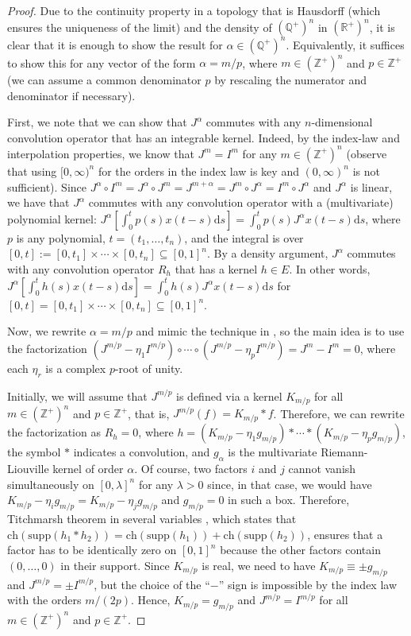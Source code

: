 \documentclass[12pt,reqno]{amsart}
\theoremstyle{plain}
\numberwithin{equation}{section} %
\begin{document}
\begin{proof}
Due to the continuity property in a topology that is Hausdorff (which ensures the uniqueness of the limit) and the density of $(\mathbb{Q}^+)^n$ in $(\mathbb{R}^+)^n$, it is clear that it is enough to show the result for $\alpha \in (\mathbb{Q}^+)^n$. Equivalently, it suffices to show this for any vector of the form $\alpha=m/p$, where $m \in (\mathbb{Z}^+)^n$ and $p \in \mathbb{Z}^+$ (we can assume a common denominator $p$ by rescaling the numerator and denominator if necessary). 

First, we note that we can show that $J^{\alpha}$ commutes with any $n$-dimensional convolution operator that has an integrable kernel. Indeed, by the index-law and interpolation properties, we know that $J^m=I^m$ for any $m \in (\mathbb{Z}^+)^n$ (observe that using $[0,\infty)^n$ for the orders in the index law is key and $(0,\infty)^n$ is not sufficient). Since $J^{\alpha}\circ I^m=J^{\alpha}\circ J^m=J^{m+\alpha}=J^m\circ J^{\alpha}=I^m\circ J^{\alpha}$ and $J^{\alpha}$ is linear, we have that $J^{\alpha}$ commutes with any convolution operator with a (multivariate) polynomial kernel: $J^{\alpha}[\int_0^t p(s)x(t-s)\mathrm{d}s]=\int_0^t p(s)J^\alpha x(t-s)\mathrm{d}s$, where $p$ is any polynomial, $t=(t_1,\ldots,t_n)$, and the integral is over $[0,t]:=[0,t_1]\times\cdots\times [0,t_n]\subseteq [0,1]^n$. By a density argument, $J^\alpha$ commutes with any convolution operator $R_h$ that has a kernel $h\in E$. In other words, $J^\alpha[\int_0^t h(s)x(t-s)\mathrm{d}s]=\int_0^t h(s)J^\alpha x(t-s)\mathrm{d}s$ for $[0,t]=[0,t_1]\times\cdots\times [0,t_n]\subseteq [0,1]^n$.

Now, we rewrite $\alpha=m/p$ and mimic the technique in \cite{cart}, so the main idea is to use the factorization $(J^{m/p}-\eta_1 I^{m/p})\circ \cdots \circ (J^{m/p}-\eta_p I^{m/p})=J^m-I^m=0$, where each $\eta_r$ is a complex $p$-root of unity. 

Initially, we will assume that $J^{m/p}$ is defined via a kernel $K_{m/p}$ for all $m \in (\mathbb{Z}^+)^n$ and $p \in \mathbb{Z}^+$, that is, $J^{m/p}(f)=K_{m/p}*f$. Therefore, we can rewrite the factorization as $R_h=0$, where $h=(K_{m/p}-\eta_1 g_{m/p})*\cdots\ast(K_{m/p}-\eta_p g_{m/p})$, the symbol $\ast$ indicates a convolution, and $g_\alpha$ is the multivariate Riemann-Liouville kernel of order $\alpha$. Of course, two factors $i$ and $j$ cannot vanish simultaneously on $[0,\lambda]^n$ for any $\lambda>0$ since, in that case, we would have $K_{m/p}-\eta_i g_{m/p}=K_{m/p}-\eta_j g_{m/p}$ and $g_{m/p}=0$ in such a box. Therefore, Titchmarsh theorem in several variables \cite{Lions}, which states that $\mathrm{ch}(\mathrm{supp}(h_1\ast h_2))=\mathrm{ch}(\mathrm{supp}(h_1))+\mathrm{ch}(\mathrm{supp}(h_2))$, ensures that a factor has to be identically zero on $[0,1]^n$ because the other factors contain $(0,\ldots,0)$ in their support. Since $K_{m/p}$ is real, we need to have $K_{m/p}\equiv \pm g_{m/p}$ and $J^{m/p}=\pm I^{m/p}$, but the choice of the ``$-$'' sign is impossible by the index law with the orders $m/(2p)$. Hence, $K_{m/p}= g_{m/p}$ and $J^{m/p}=I^{m/p}$ for all $m \in (\mathbb{Z}^+)^n$ and $p \in \mathbb{Z}^+$.


\end{proof}
\end{document}
